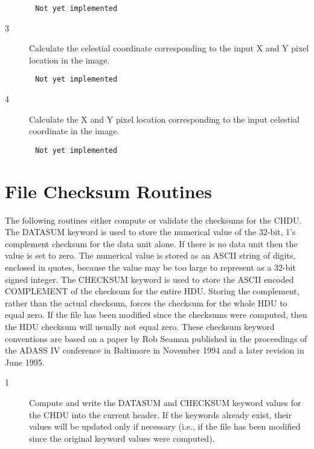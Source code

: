 \begin{verbatim}
       Not yet implemented
\end{verbatim}

\begin{description}
\item[3 ]  Calculate the celestial coordinate corresponding to the input
    X and Y pixel location in the image.
\end{description}

\begin{verbatim}
       Not yet implemented
\end{verbatim}

\begin{description}
\item[4 ]  Calculate the X and Y pixel location corresponding to the input
    celestial coordinate in the image.
\end{description}

\begin{verbatim}
       Not yet implemented
\end{verbatim}


\section{File Checksum Routines \label{FFPCKS}}

The following routines either compute or validate the checksums for the
CHDU.  The DATASUM keyword is used to store the numerical value of the
32-bit, 1's complement checksum for the data unit alone.  If there is
no data unit then the value is set to zero. The numerical value is
stored as an ASCII string of digits, enclosed in quotes, because the
value may be too large to represent as a 32-bit signed integer.  The
CHECKSUM keyword is used to store the ASCII encoded COMPLEMENT of the
checksum for the entire HDU.  Storing the complement, rather than the
actual checksum, forces the checksum for the whole HDU to equal zero.
If the file has been modified since the checksums were computed, then
the HDU checksum will usually not equal zero.  These checksum keyword
conventions are based on a paper by Rob Seaman published in the
proceedings of the ADASS IV conference in Baltimore in November 1994
and a later revision in June 1995.


\begin{description}
\item[1 ] Compute and write the DATASUM and CHECKSUM keyword values for the CHDU
    into the current header.  If the keywords already exist, their values
    will be updated only if necessary (i.e., if the file
    has been modified since the original keyword
   values were computed).
\end{description}

